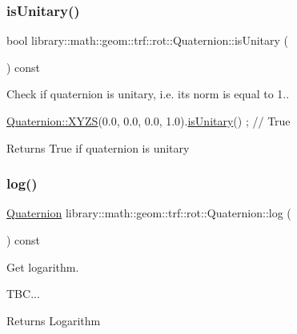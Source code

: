 \subsubsection{\texorpdfstring{is\+Unitary()}{isUnitary()}}
{\footnotesize\ttfamily bool library\+::math\+::geom\+::trf\+::rot\+::\+Quaternion\+::is\+Unitary (\begin{DoxyParamCaption}{ }\end{DoxyParamCaption}) const}



Check if quaternion is unitary, i.\+e. its norm is equal to 1.. 


\begin{DoxyCode}
\hyperlink{classlibrary_1_1math_1_1geom_1_1trf_1_1rot_1_1_quaternion_ad6426210c54c79fc5296b5375380a7ca}{Quaternion::XYZS}(0.0, 0.0, 0.0, 1.0).\hyperlink{classlibrary_1_1math_1_1geom_1_1trf_1_1rot_1_1_quaternion_aa5e8e0dc04aa0ac976106c823b61d911}{isUnitary}() ; \textcolor{comment}{// True}
\end{DoxyCode}


\begin{DoxyReturn}{Returns}
True if quaternion is unitary 
\end{DoxyReturn}
\mbox{\label{classlibrary_1_1math_1_1geom_1_1trf_1_1rot_1_1_quaternion_a9bcc04be5d0b9128860c9e494abbf5ee}} 
\subsubsection{\texorpdfstring{log()}{log()}}
{\footnotesize\ttfamily \hyperlink{classlibrary_1_1math_1_1geom_1_1trf_1_1rot_1_1_quaternion}{Quaternion} library\+::math\+::geom\+::trf\+::rot\+::\+Quaternion\+::log (\begin{DoxyParamCaption}{ }\end{DoxyParamCaption}) const}



Get logarithm. 


\begin{DoxyCode}
TBC...
\end{DoxyCode}


\begin{DoxyReturn}{Returns}
Logarithm 
\end{DoxyReturn}
\mbox{\label{classlibrary_1_1math_1_1geom_1_1trf_1_1rot_1_1_quaternion_aa37cf6c1b2b1e99a5b4dbe8b20d6be71}} 
